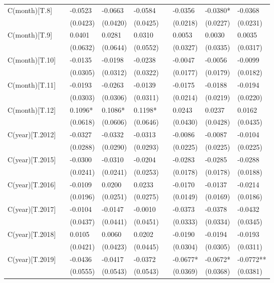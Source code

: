 \begin{tabular}{lllllllll}
C(month)[T.8] &  & -0.0523 & -0.0663 & -0.0584 &  & -0.0356 & -0.0380* & -0.0368 \\
 &  & (0.0423) & (0.0420) & (0.0425) &  & (0.0218) & (0.0227) & (0.0231) \\
C(month)[T.9] &  & 0.0401 & 0.0281 & 0.0310 &  & 0.0053 & 0.0030 & 0.0035 \\
 &  & (0.0632) & (0.0644) & (0.0552) &  & (0.0327) & (0.0335) & (0.0317) \\
C(month)[T.10] &  & -0.0135 & -0.0198 & -0.0238 &  & -0.0047 & -0.0056 & -0.0099 \\
 &  & (0.0305) & (0.0312) & (0.0322) &  & (0.0177) & (0.0179) & (0.0182) \\
C(month)[T.11] &  & -0.0193 & -0.0263 & -0.0139 &  & -0.0175 & -0.0188 & -0.0194 \\
 &  & (0.0303) & (0.0306) & (0.0311) &  & (0.0214) & (0.0219) & (0.0220) \\
C(month)[T.12] &  & 0.1096* & 0.1086* & 0.1198* &  & 0.0243 & 0.0237 & 0.0162 \\
 &  & (0.0618) & (0.0606) & (0.0646) &  & (0.0430) & (0.0428) & (0.0435) \\
C(year)[T.2012] &  & -0.0327 & -0.0332 & -0.0313 &  & -0.0086 & -0.0087 & -0.0104 \\
 &  & (0.0288) & (0.0290) & (0.0293) &  & (0.0225) & (0.0225) & (0.0225) \\
C(year)[T.2015] &  & -0.0300 & -0.0310 & -0.0204 &  & -0.0283 & -0.0285 & -0.0288 \\
 &  & (0.0241) & (0.0241) & (0.0253) &  & (0.0178) & (0.0178) & (0.0188) \\
C(year)[T.2016] &  & -0.0109 & 0.0200 & 0.0233 &  & -0.0170 & -0.0137 & -0.0214 \\
 &  & (0.0196) & (0.0251) & (0.0275) &  & (0.0149) & (0.0169) & (0.0186) \\
C(year)[T.2017] &  & -0.0104 & -0.0147 & -0.0010 &  & -0.0373 & -0.0378 & -0.0432 \\
 &  & (0.0437) & (0.0441) & (0.0451) &  & (0.0333) & (0.0334) & (0.0345) \\
C(year)[T.2018] &  & 0.0105 & 0.0060 & 0.0202 &  & -0.0190 & -0.0194 & -0.0193 \\
 &  & (0.0421) & (0.0423) & (0.0445) &  & (0.0304) & (0.0305) & (0.0311) \\
C(year)[T.2019] &  & -0.0436 & -0.0417 & -0.0372 &  & -0.0677* & -0.0672* & -0.0772** \\
 &  & (0.0555) & (0.0543) & (0.0543) &  & (0.0369) & (0.0368) & (0.0381) \\

\end{tabular}
